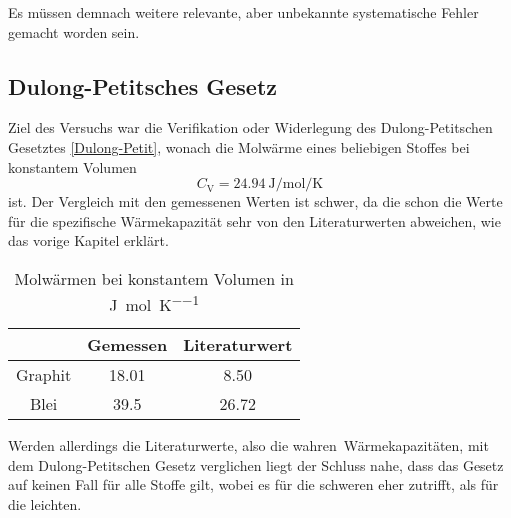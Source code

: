 Es müssen demnach weitere relevante, aber unbekannte systematische Fehler gemacht worden sein.


\newpage
\subsection{Dulong-Petitsches Gesetz}
Ziel des Versuchs war die Verifikation oder Widerlegung des Dulong-Petitschen Gesetztes \eqref{Dulong-Petit}, wonach die Molwärme eines beliebigen Stoffes bei konstantem Volumen
\begin{equation}
	C_\text{V} = \SI{24.94}{\joule\per\mol\per\kelvin}
\end{equation}
ist.
Der Vergleich mit den gemessenen Werten ist schwer, da die schon die Werte für die spezifische Wärmekapazität sehr von den Literaturwerten abweichen, wie das vorige Kapitel erklärt.
\begin{table}[h]
	\begin{center}
		\begin{tabular}{c | c | c}
			& Gemessen	& Literaturwert %
			\\
			\hline
			Graphit & 18.01 & 8.50 \\
			Blei & 39.5 & 26.72
		\end{tabular}
		\caption{Molwärmen bei konstantem Volumen in \si{\joule\per\mol\per\kelvin}}
	\end{center}
\end{table}
Werden allerdings die Literaturwerte, also die \glqq wahren\grqq\ Wärmekapazitäten, mit dem Dulong-Petitschen Gesetz verglichen liegt der Schluss nahe, dass das Gesetz auf keinen Fall für alle Stoffe gilt, wobei es für die schweren eher zutrifft, als für die leichten.
